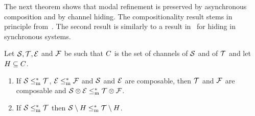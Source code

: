 The next theorem shows that modal refinement is preserved by asynchronous composition and by channel hiding.
The compositionality result stems in principle from~\cite{DBLP:conf/ershov/HuttelL89}. The second result is similarly to a result in~\cite{hennicker_knapp_2011} for hiding in synchronous systems.

\begin{theorem}\label{thm:wmr}
    Let $\S, \T, \E$ and $\F$ be \MAIOTSs such that $\chan$ is the set of channels of $\S$ and of $\T$ and let $H \subseteq \chan$.
\begin{enumerate}
\item\label{thm:copos-wmr}
If $\S \mrw \T$, $\E \mrw \F$ and $\S$ and $\E$ are composable, then $\T$ and $\F$ are composable and $\S \compos \E \mrw \T \compos \F$.
\item\label{thm:wmr-hiding}
If $\S \mrw \T$ then $\S \setminus H \mrw \T \setminus H$.
 \end{enumerate}
\end{theorem}

